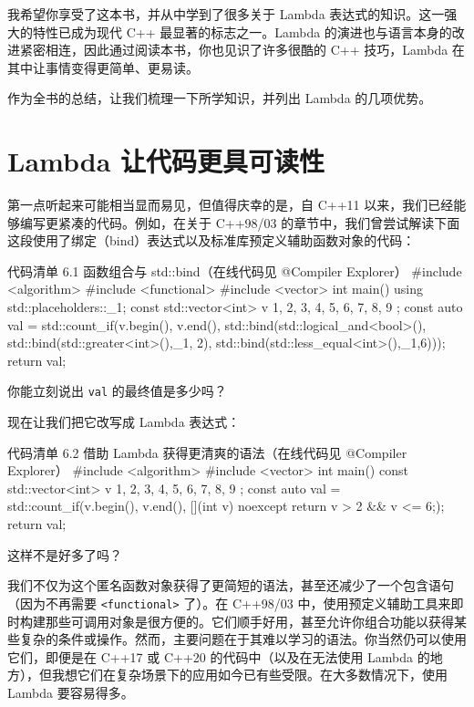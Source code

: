 我希望你享受了这本书，并从中学到了很多关于 Lambda 表达式的知识。这一强大的特性已成为现代 C++ 最显著的标志之一。Lambda 的演进也与语言本身的改进紧密相连，因此通过阅读本书，你也见识了许多很酷的 C++ 技巧，Lambda 在其中让事情变得更简单、更易读。

作为全书的总结，让我们梳理一下所学知识，并列出 Lambda 的几项优势。

\section{Lambda 让代码更具可读性}

第一点听起来可能相当显而易见，但值得庆幸的是，自 C++11 以来，我们已经能够编写更紧凑的代码。例如，在关于 C++98/03 的章节中，我们曾尝试解读下面这段使用了绑定（bind）表达式以及标准库预定义辅助函数对象的代码：

\begin{codeboxt}{代码清单 6.1 函数组合与 std::bind（在线代码见 @Compiler Explorer）}
#include <algorithm>
#include <functional>
#include <vector>
int main() {
using std::placeholders::_1;
const std::vector<int> v { 1, 2, 3, 4, 5, 6, 7, 8, 9 };
const auto val = std::count_if(v.begin(), v.end(),
std::bind(std::logical_and<bool>(),
std::bind(std::greater<int>(),_1, 2),
std::bind(std::less_equal<int>(),_1,6)));
return val;
}
\end{codeboxt}

你能立刻说出 \texttt{val} 的最终值是多少吗？

现在让我们把它改写成 Lambda 表达式：

\begin{codeboxt}{代码清单 6.2 借助 Lambda 获得更清爽的语法（在线代码见 @Compiler Explorer）}
#include <algorithm>
#include <vector>
int main() {
const std::vector<int> v { 1, 2, 3, 4, 5, 6, 7, 8, 9 };
const auto val = std::count_if(v.begin(), v.end(),
[](int v) noexcept { return v > 2 && v <= 6;});
return val;
}
\end{codeboxt}

这样不是好多了吗？

我们不仅为这个匿名函数对象获得了更简短的语法，甚至还减少了一个包含语句（因为不再需要 \texttt{<functional>} 了）。在 C++98/03 中，使用预定义辅助工具来即时构建那些可调用对象是很方便的。它们顺手好用，甚至允许你组合功能以获得某些复杂的条件或操作。然而，主要问题在于其难以学习的语法。你当然仍可以使用它们，即便是在 C++17 或 C++20 的代码中（以及在无法使用 Lambda 的地方），但我想它们在复杂场景下的应用如今已有些受限。在大多数情况下，使用 Lambda 要容易得多。

